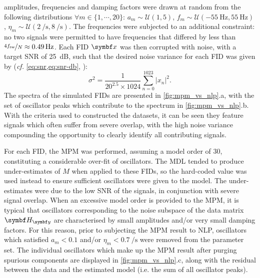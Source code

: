 amplitudes, frequencies and damping factors were drawn at random from the
following distributions
$\forall m \in \lbrace 1, \cdots, 20\rbrace$:
$a_m \sim \mathcal{U}(1, 5)$, $f_m \sim \mathcal{U}(\qty{-55}{\hertz},
\qty{55}{\hertz})$, $\eta_m \sim \mathcal{U}(\qty{2}{\per\second},
\qty{8}{\per\second})$. The frequencies were subjected to an additional
constraint: no two signals were permitted to have frequencies that
differed by less than $\nicefrac{4 f_{\mathrm{sw}}}{N} \approx \qty{0.49}{\hertz}$.
Each \ac{FID} $\bx$ was then corrupted with noise, with a target
\ac{SNR} of \qty{25}{\deci\bel}, such that the desired noise variance for each
\ac{FID} was given by (\emph{cf.} \cref{eq:snr,eq:snr-db}, ):
\begin{equation}
    \sigma^2 = \frac{1}{20^{2.5} \times 1024}
        \sum_{n=0}^{1023} \lvert x_n \rvert^2.
\end{equation}
The spectra of the simulated \acp{FID} are presented in
\cref{fig:mpm_vs_nlp}.a, with the set of oscillator peaks which contribute
to the spectrum in \cref{fig:mpm_vs_nlp}.b. With the criteria used to
constructed the datasets, it can be seen they feature signals which often
suffer from severe overlap, with the high noise variance compounding the
opportunity to clearly identify all contributing signals.

For each \ac{FID}, the \ac{MPM} was performed, assuming a model order of
30, constituting a considerable over-fit of oscillators. The \ac{MDL} tended to
produce under-estimates of $M$ when applied to these \acp{FID}, so the
hard-coded value was used instead to ensure sufficient oscillators were given
to the model. The under-estimates were due to the
low \ac{SNR} of the signals, in
conjunction with severe signal overlap. When an excessive model order is
provided to the \ac{MPM}, it is typical that oscillators corresponding to the
noise subspace of the data matrix $\Hy$ are characterised by small amplitudes
and/or very small damping factors. For this reason, prior to subjecting the
\ac{MPM} result to \ac{NLP}, oscillators which satisfied $a_m < 0.1$ and/or
$\eta_m < \qty{0.7}{\per\second}$ were removed from the parameter set. The
individual oscillators which make up the \ac{MPM} result after purging spurious
components are displayed in \cref{fig:mpm_vs_nlp}.c, along with the
residual between the data and the estimated model (i.e. the sum of all
oscillator peaks).

